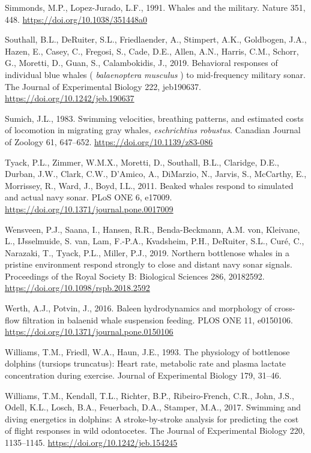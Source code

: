 \documentclass[]{elsarticle} %
\begin{document}
\hypertarget{ref-simmonds_whales_1991}{}
Simmonds, M.P., Lopez-Jurado, L.F., 1991. Whales and the military.
Nature 351, 448. \url{https://doi.org/10.1038/351448a0}

\hypertarget{ref-southall_behavioral_2019}{}
Southall, B.L., DeRuiter, S.L., Friedlaender, A., Stimpert, A.K.,
Goldbogen, J.A., Hazen, E., Casey, C., Fregosi, S., Cade, D.E., Allen,
A.N., Harris, C.M., Schorr, G., Moretti, D., Guan, S., Calambokidis, J.,
2019. Behavioral responses of individual blue whales (
\emph{balaenoptera musculus} ) to mid-frequency military sonar. The
Journal of Experimental Biology 222, jeb190637.
\url{https://doi.org/10.1242/jeb.190637}

\hypertarget{ref-sumich_swimming_1983}{}
Sumich, J.L., 1983. Swimming velocities, breathing patterns, and
estimated costs of locomotion in migrating gray whales,
\emph{eschrichtius robustus}. Canadian Journal of Zoology 61, 647--652.
\url{https://doi.org/10.1139/z83-086}

\hypertarget{ref-tyack_beaked_2011}{}
Tyack, P.L., Zimmer, W.M.X., Moretti, D., Southall, B.L., Claridge,
D.E., Durban, J.W., Clark, C.W., D'Amico, A., DiMarzio, N., Jarvis, S.,
McCarthy, E., Morrissey, R., Ward, J., Boyd, I.L., 2011. Beaked whales
respond to simulated and actual navy sonar. PLoS ONE 6, e17009.
\url{https://doi.org/10.1371/journal.pone.0017009}

\hypertarget{ref-wensveen_northern_2019}{}
Wensveen, P.J., Saana, I., Hansen, R.R., Benda-Beckmann, A.M. von,
Kleivane, L., IJsselmuide, S. van, Lam, F.-P.A., Kvadsheim, P.H.,
DeRuiter, S.L., Curé, C., Narazaki, T., Tyack, P.L., Miller, P.J., 2019.
Northern bottlenose whales in a pristine environment respond strongly to
close and distant navy sonar signals. Proceedings of the Royal Society
B: Biological Sciences 286, 20182592.
\url{https://doi.org/10.1098/rspb.2018.2592}

\hypertarget{ref-werth_baleen_2016}{}
Werth, A.J., Potvin, J., 2016. Baleen hydrodynamics and morphology of
cross-flow filtration in balaenid whale suspension feeding. PLOS ONE 11,
e0150106. \url{https://doi.org/10.1371/journal.pone.0150106}

\hypertarget{ref-williams_physiology_1993}{}
Williams, T.M., Friedl, W.A., Haun, J.E., 1993. The physiology of
bottlenose dolphins (tursiops truncatus): Heart rate, metabolic rate and
plasma lactate concentration during exercise. Journal of Experimental
Biology 179, 31--46.

\hypertarget{ref-williams_swimming_2017}{}
Williams, T.M., Kendall, T.L., Richter, B.P., Ribeiro-French, C.R.,
John, J.S., Odell, K.L., Losch, B.A., Feuerbach, D.A., Stamper, M.A.,
2017. Swimming and diving energetics in dolphins: A stroke-by-stroke
analysis for predicting the cost of flight responses in wild
odontocetes. The Journal of Experimental Biology 220, 1135--1145.
\url{https://doi.org/10.1242/jeb.154245}
\end{document}

